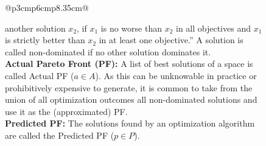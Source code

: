 \documentclass[sigconf,anonymous,review]{acmart}
\newcommand\TODO[1]{\textcolor{ScarletRed}{\textbf{\colorbox{yellow}{\small TODO:}} \emph{#1}}\xspace}
\begin{document}
\begin{figure}
{\begin{tabular}{@{}p{3cm}p{6cm}p{8.35cm}@{}}
{\begin{minipage}[b]{0.63\linewidth}
                                another solution $x_2$, if $x_1$ is no worse than $x_2$ in all objectives
                                and $x_1$ is strictly better than $x_2$ in at least one objective.'' A solution is called non-dominated if no other solution dominates it.\\
                		        \textbf{Actual {Pareto Front} (PF): } A list of best solutions of a space is called Actual PF ($a\in A$). As this can be unknowable in practice or prohibitively expensive to generate, it is common to take from the union of all optimization outcomes all non-dominated solutions and use it as the (approximated) PF.\\ 
                		        \textbf{Predicted PF: } The solutions found by {an optimization} algorithm are called the Predicted PF ($p\in P$).
                		\end{minipage}
                } \\ 
                 \\
\end{tabular}}
\end{figure}
\end{document}
